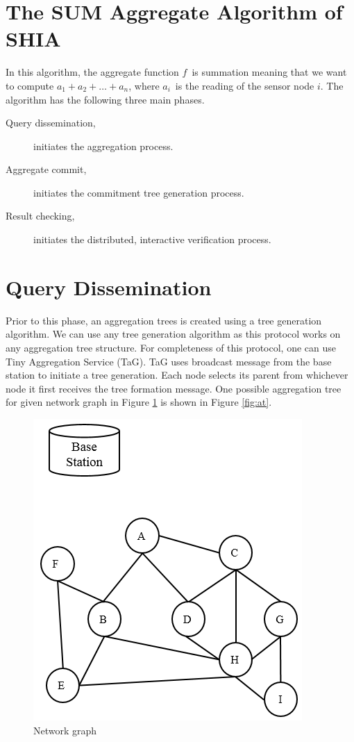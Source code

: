 \section{The SUM Aggregate Algorithm of SHIA}
	In this algorithm, the aggregate function $f$\ is summation meaning that we want to compute $a_{1} + a_{2} + \dotsc + a_{n}$, where $a_{i}$\ is the reading of the sensor node $i$.
	The algorithm has the following three main phases.
	\begin{description}
		\item [Query dissemination,] initiates the aggregation process.
		\item [Aggregate commit,] initiates the commitment tree generation process.
		\item [Result checking,] initiates the distributed, interactive verification process.
	\end{description}

\section{Query Dissemination}
	\label{sec:query-dissemination}
	Prior to this phase, an aggregation trees is created using a tree generation algorithm.
	We can use any tree generation algorithm as this protocol works on any aggregation tree structure.
	For completeness of this protocol, one can use Tiny Aggregation Service (TaG)\cite{madden2002tag}.
	TaG uses broadcast message from the base station to initiate a tree generation.
	Each node selects its parent from whichever node it first receives the tree formation message.
	One possible aggregation tree for given network graph in Figure \ref{fig:ng} is shown in Figure \ref{fig:at}. 
	\begin{figure}[h!]
		\centering
		\includegraphics[scale = 1]{images/network-graph.png}
		\caption{Network graph}
		\label{fig:ng}
	\end{figure}

